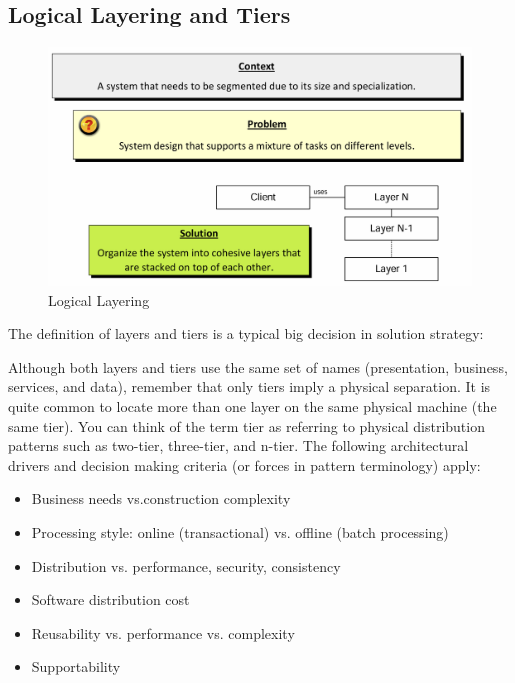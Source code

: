 \documentclass[../Main.tex]{subfiles}
\begin{document}

\subsection{Logical Layering and Tiers}

\begin{figure}[H]
    \centering
    \includegraphics[width=0.75\linewidth]{Images/logicallayering.png}
    \caption{Logical Layering}
\end{figure}

The definition of layers and tiers is a typical
big decision in solution strategy:

Although both layers and tiers use the same set of names 
(presentation, business, services, and data), 
remember that only tiers imply a physical separation.
It is quite common to locate more than one layer on the
same physical machine (the same tier). You can think of
the term tier as referring to physical distribution
patterns such as two-tier, three-tier, and n-tier.
The following architectural drivers and decision making criteria (or forces in pattern terminology) apply:
\begin{itemize}
    \item Business needs vs.construction complexity
    \item Processing style: online (transactional) vs. offline (batch processing)
    \item Distribution vs. performance, security, consistency
    \item Software distribution cost
    \item Reusability vs. performance vs. complexity
    \item Supportability
\end{itemize}
\end{document}
